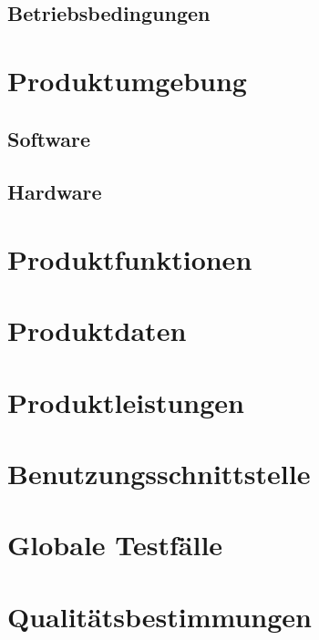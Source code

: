 \documentclass[a4paper]{scrreprt}
\begin{document}
\section{Betriebsbedingungen}

\chapter{Produktumgebung}

\section{Software}

\section{Hardware}

\chapter{Produktfunktionen}

\chapter{Produktdaten}

\chapter{Produktleistungen}

\chapter{Benutzungsschnittstelle}

\chapter{Globale Testfälle}

\chapter{Qualitätsbestimmungen}

\begin{appendices}
\end{appendices}

\listoffigures
\end{document}
